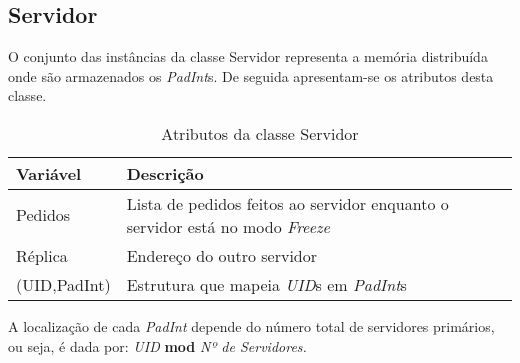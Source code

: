 \subsection{Servidor}
O conjunto das instâncias da classe Servidor representa a memória distribuída onde são armazenados os \textit{PadInt}s. De seguida apresentam-se os atributos desta classe.
\begin{table}[H]
\centering
\begin{tabular}{| p{2cm} | p{} |}
\hline
\textbf{Variável} & \textbf{Descrição} \\
\hline
Pedidos & Lista de pedidos feitos ao servidor enquanto o servidor está no modo \textit{Freeze} \\
\hline
Réplica & Endereço do outro servidor \\
\hline
(UID,PadInt) & Estrutura que mapeia \textit{UID}s em \textit{PadInt}s \\
\hline
\end{tabular}
\caption{Atributos da classe Servidor}
\end{table}

A localização de cada \textit{PadInt} depende do número total de servidores primários, ou seja, é dada por: \textit{UID} \textbf{mod}  \textit{Nº de Servidores.}
